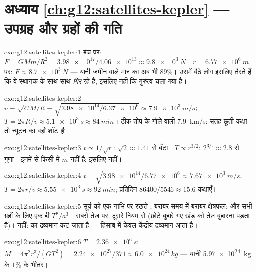 \section*{अध्याय \ref{ch:g12:satellites-kepler} --- उपग्रह और ग्रहों की गति}

\begin{solution}{exo:g12:satellites-kepler:1}
मंच पर: $F = GMm/R^2 = \num{3.98e17}/\num{4.06e13} \approx
\qty{9.8e3}{N}$। $r = \qty{6.77e6}{m}$ पर: $F \approx \qty{8.7e3}{N}$ --- यानी ज़मीन वाले मान का अब भी $89\%$। उसमें
बैठे लोग इसलिए तैरते हैं कि वे स्थानक के साथ-साथ \emph{गिर} रहे हैं, इसलिए
नहीं कि गुरुत्व चला गया है।
\end{solution}

\begin{solution}{exo:g12:satellites-kepler:2}
$v = \sqrt{GM/R} = \sqrt{\num{3.98e14}/\num{6.37e6}} \approx
\qty{7.9e3}{m/s}$; $T = 2\pi R/v \approx \qty{5.1e3}{s} \approx
\qty{84}{min}$। ठीक तोप के गोले वाली \qty{7.9}{km/s}: सतह छूती कक्षा तो न्यूटन
का वही शॉट \emph{है}।
\end{solution}

\begin{solution}{exo:g12:satellites-kepler:3}
$v \propto 1/\sqrt{r}$: $\sqrt 2 \approx 1.41$ से बँटा। $T \propto r^{3/2}$: $2^{3/2} \approx 2.8$ से गुणा। इनमें से किसी में $m$ नहीं
है: इसलिए नहीं।
\end{solution}

\begin{solution}{exo:g12:satellites-kepler:4}
$v = \sqrt{\num{3.98e14}/\num{6.77e6}} \approx \qty{7.67e3}{m/s}$; $T = 2\pi r/v \approx \qty{5.55e3}{s} \approx \qty{92}{min}$; प्रतिदिन $\num{86400}/5546 \approx 15.6$ कक्षाएँ।
\end{solution}

\begin{solution}{exo:g12:satellites-kepler:5}
सूर्य को एक नाभि पर रखते ; बराबर समय में बराबर क्षेत्रफल;
और सभी ग्रहों के लिए एक ही $T^2/a^3$। सबसे तेज़  पर, दूसरे नियम से
(छोटे बुहारे गए खंड को तेज़ बुहारना पड़ता है)। नहीं:  का
द्रव्यमान कट जाता है --- हिसाब में केवल केंद्रीय द्रव्यमान आता है।
\end{solution}

\begin{solution}{exo:g12:satellites-kepler:6}
$T = \qty{2.36e6}{s}$: $M = 4\pi^2 r^3/(GT^2) =
\num{2.24e27}/371 \approx \qty{6.0e24}{kg}$ --- यानी \qty{5.97e24}{kg} के $1\%$ के भीतर।
\end{solution}

